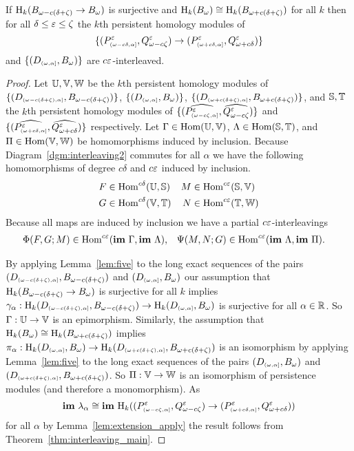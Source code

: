\begin{lemma}\label{lem:pt_interleaving}
  If $\hom_k(\b\to\B)$ is surjective and $\hom_k(\B)\cong \hom_k(\BB)$ for all $k$ then for all $\delta\leq\e\leq\zeta$ the $k$th persistent homology modules of \[\{(P^\e\subi{\omega-c\of,\alpha},\Q^\e)\to(P^\e\subi{\omega+c\of,\alpha},\QQ^\e)\}\] and $\{(D\subi{\omega,\alpha}, \B)\}$ are $c\e$-interleaved.
\end{lemma}
\begin{proof}
  Let $\U, \V, \W$ be the $k$th persistent homology modules of $\{(D\subi{\omega-c(\delta+\zeta), \alpha}, \b)\}$, $\{(D\subi{\omega,\alpha}, \B)\}$, $\{(D\subi{\omega+c(\delta+\zeta),\alpha}, \BB)\}$, and $\S, \T$ the $k$th persistent homology modules of $\{(\ext{P^\e\subi{\omega-c\zeta,\alpha}},\ext{\Q^\e})\}$ and $\{(\ext{P^\e\subi{\omega+c\of,\alpha}},\ext{\QQ^\e})\}$ respectively.
  Let $\Gamma\in\Hom(\U,\V)$, $\Lambda\in\Hom(\S, \T)$, and $\Pi\in\Hom(\V,\W)$ be homomorphisms induced by inclusion.
  Because Diagram~\ref{dgm:interleaving2} commutes for all $\alpha$ we have the following homomorphisms of degree $c\delta$ and $c\e$ induced by inclusion.
  \begin{align*}
    F&\in\Hom^{c\delta}(\U,\S)& M&\in\Hom^{c\e}(\S,\V)\\
    G&\in\Hom^{c\delta}(\V,\T)& N&\in\Hom^{c\e}(\T,\W)
  \end{align*}
  Because all maps are induced by inclusion we have a partial $c\e$-interleavings
  \begin{align*}
    \Phi(F, G; M)&\in\Hom^{c\e}(\im~\Gamma, \im~\Lambda), & \Psi(M, N; G)&\in\Hom^{c\e}(\im~\Lambda, \im~\Pi).
  \end{align*}

  By applying Lemma~\ref{lem:five} to the long exact sequences of the pairs $(D\subi{\omega-c(\delta+\zeta),\alpha},\b)$ and $(D\subi{\omega,\alpha},\B)$ our assumption that $\hom_k(\b\to\B)$ is surjective for all $k$ implies $\gamma_\alpha : \hom_k(D\subi{\omega-c(\delta+\zeta),\alpha},\b)\to \hom_k(D\subi{\omega,\alpha},\B)$ is surjective for all $\alpha\in\R$.
  So $\Gamma : \U\to \V$ is an epimorphism.
  Similarly, the assumption that $\hom_k(\B)\cong \hom_k(\BB)$ implies $\pi_\alpha : \hom_k(D\subi{\omega,\alpha},\B)\to \hom_k(D\subi{\omega+c(\delta+\zeta),\alpha},\BB)$ is an isomorphism by applying Lemma~\ref{lem:five} to the long exact sequences of the pairs $(D\subi{\omega,\alpha},\B)$ and $(D\subi{\omega+c(\delta+\zeta),\alpha},\BB)$.
  So $\Pi : \V\to\W$ is an isomorphism of persistence modules (and therefore a monomorphism).
  As \[\im~\lambda_\alpha \cong \im~\hom_k((P\subi{\omega-c\zeta,\alpha}^\e,\Q^\e)\to (P\subi{\omega+c\delta,\alpha}^\e,\QQ^\e))\]
  for all $\alpha$ by Lemma~\ref{lem:extension_apply} the result follows from Theorem~\ref{thm:interleaving_main}.


\end{proof}
